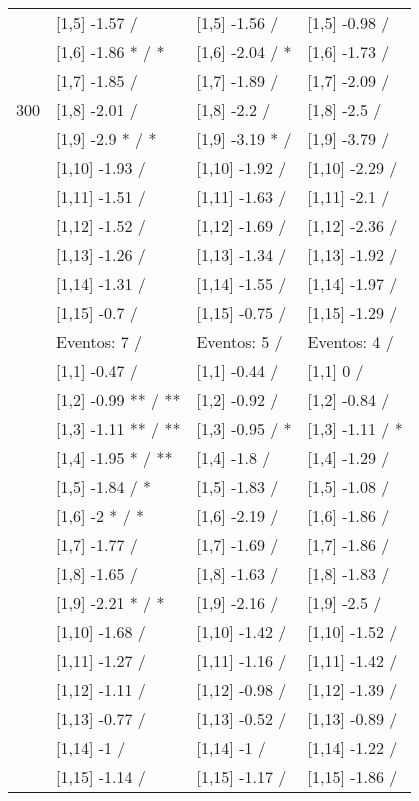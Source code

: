 \begin{table}
\begin{tabular}[t]{llll}
 & {}[1,5] -1.57  / & {}[1,5] -1.56  / & {}[1,5] -0.98  /\\
 & {}[1,6] -1.86 * / * & {}[1,6] -2.04  / * & {}[1,6] -1.73  /\\
 & {}[1,7] -1.85  / & {}[1,7] -1.89  / & {}[1,7] -2.09  /\\
300 & {}[1,8] -2.01  / & {}[1,8] -2.2  / & {}[1,8] -2.5  /\\
\addlinespace
 & {}[1,9] -2.9 * / * & {}[1,9] -3.19 * / & {}[1,9] -3.79  /\\
 & {}[1,10] -1.93  / & {}[1,10] -1.92  / & {}[1,10] -2.29  /\\
 & {}[1,11] -1.51  / & {}[1,11] -1.63  / & {}[1,11] -2.1  /\\
 & {}[1,12] -1.52  / & {}[1,12] -1.69  / & {}[1,12] -2.36  /\\
 & {}[1,13] -1.26  / & {}[1,13] -1.34  / & {}[1,13] -1.92  /\\
\addlinespace
 & {}[1,14] -1.31  / & {}[1,14] -1.55  / & {}[1,14] -1.97  /\\
 & {}[1,15] -0.7  / & {}[1,15] -0.75  / & {}[1,15] -1.29  /\\
 & Eventos:  7 / & Eventos:  5 / & Eventos:  4 /\\
 & {}[1,1] -0.47  / & {}[1,1] -0.44  / & {}[1,1] 0  /\\
 & {}[1,2] -0.99 ** / ** & {}[1,2] -0.92  / & {}[1,2] -0.84  /\\
\addlinespace
 & {}[1,3] -1.11 ** / ** & {}[1,3] -0.95  / * & {}[1,3] -1.11  / *\\
 & {}[1,4] -1.95 * / ** & {}[1,4] -1.8  / & {}[1,4] -1.29  /\\
 & {}[1,5] -1.84  / * & {}[1,5] -1.83  / & {}[1,5] -1.08  /\\
 & {}[1,6] -2 * / * & {}[1,6] -2.19  / & {}[1,6] -1.86  /\\
 & {}[1,7] -1.77  / & {}[1,7] -1.69  / & {}[1,7] -1.86  /\\
\addlinespace
500 & {}[1,8] -1.65  / & {}[1,8] -1.63  / & {}[1,8] -1.83  /\\
 & {}[1,9] -2.21 * / * & {}[1,9] -2.16  / & {}[1,9] -2.5  /\\
 & {}[1,10] -1.68  / & {}[1,10] -1.42  / & {}[1,10] -1.52  /\\
 & {}[1,11] -1.27  / & {}[1,11] -1.16  / & {}[1,11] -1.42  /\\
 & {}[1,12] -1.11  / & {}[1,12] -0.98  / & {}[1,12] -1.39  /\\
\addlinespace
 & {}[1,13] -0.77  / & {}[1,13] -0.52  / & {}[1,13] -0.89  /\\
 & {}[1,14] -1  / & {}[1,14] -1  / & {}[1,14] -1.22  /\\
 & {}[1,15] -1.14  / & {}[1,15] -1.17  / & {}[1,15] -1.86  /\\
\bottomrule
\end{tabular}
\end{table}
